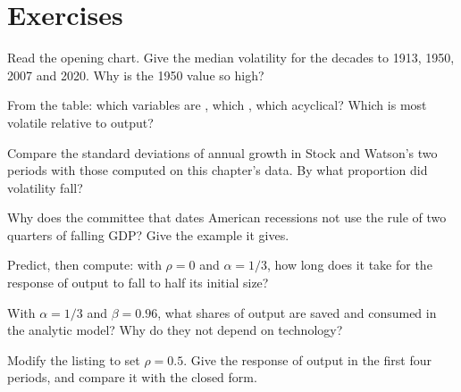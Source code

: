 \section{Exercises}\label{sec:b2:business-cycles:exercises}

\begin{exercise}[$\star$]\label{exo:b2:business-cycles:1}
Read the opening chart. Give the median volatility for the decades to 1913, 1950, 2007 and 2020. Why is the 1950 value so high?
\end{exercise}

\begin{exercise}[$\star$]\label{exo:b2:business-cycles:2}
From the table: which variables are , which , which acyclical? Which is most volatile relative to output?
\end{exercise}

\begin{exercise}[$\star$]\label{exo:b2:business-cycles:3}
Compare the standard deviations of annual growth in Stock and Watson's two periods with those computed on this chapter's data.
By what proportion did volatility fall?
\end{exercise}

\begin{exercise}[$\star$]\label{exo:b2:business-cycles:4}
Why does the committee that dates American recessions not use the rule of two quarters of falling GDP? Give the example it
gives.
\end{exercise}

\begin{exercise}[$\star\star$]\label{exo:b2:business-cycles:5}
Predict, then compute: with $\rho = 0$ and $\alpha = 1/3$, how long does it take for the response of output to fall to half its initial size?
\end{exercise}

\begin{exercise}[$\star\star$]\label{exo:b2:business-cycles:6}
With $\alpha = 1/3$ and $\beta = 0.96$, what shares of output are saved and consumed in the analytic model? Why do they not depend on technology?
\end{exercise}

\begin{exercise}[$\star\star$]\label{exo:b2:business-cycles:7}
Modify the listing to set $\rho = 0.5$. Give the response of output in the first four periods, and compare it with the closed form.
\end{exercise}

